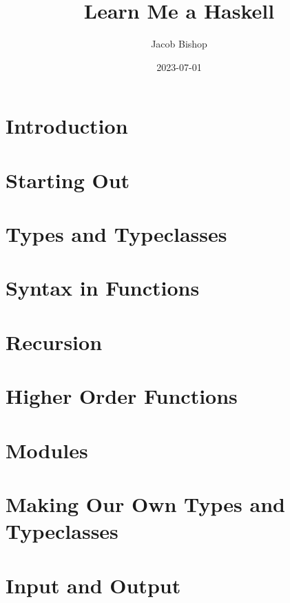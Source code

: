 \documentclass[UTF8]{ctexart}
\title{Learn Me a Haskell}
\author{Jacob Bishop}
\date{2023-07-01}
\begin{document}
\maketitle
\newpage

\section{Introduction}

\newpage

\section{Starting Out}

\newpage

\section{Types and Typeclasses}

\newpage

\section{Syntax in Functions}

\newpage

\section{Recursion}

\newpage

\section{Higher Order Functions}

\newpage

\section{Modules}

\newpage

\section{Making Our Own Types and Typeclasses}

\newpage

\section{Input and Output}

\newpage
\end{document}
